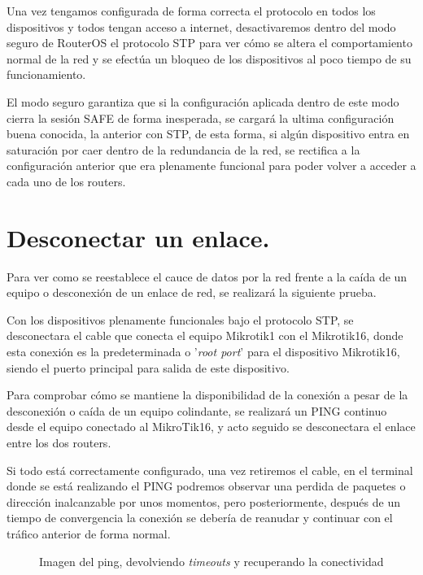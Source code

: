 Una vez tengamos configurada de forma correcta el protocolo en todos los dispositivos y todos tengan acceso a internet, desactivaremos dentro del modo seguro de RouterOS el protocolo STP para ver cómo se altera el comportamiento normal de la red y se efectúa un bloqueo de los dispositivos al poco tiempo de su funcionamiento.

El modo seguro garantiza que si la configuración aplicada dentro de este modo cierra la sesión SAFE de forma inesperada, se cargará la ultima configuración buena conocida, la anterior con STP, de esta forma, si algún dispositivo entra en saturación por caer dentro de la redundancia de la red, se rectifica a la configuración anterior que era plenamente funcional para poder volver a acceder a cada uno de los routers.

\section{Desconectar un enlace.}

Para ver como se reestablece el cauce de datos por la red frente a la caída de un equipo o desconexión de un enlace de red, se realizará la siguiente prueba.

Con los dispositivos plenamente funcionales bajo el protocolo STP, se desconectara el cable que conecta el equipo Mikrotik1 con el Mikrotik16, donde esta conexión es la predeterminada o '\textit{root port}' para el dispositivo Mikrotik16, siendo el puerto principal para salida de este dispositivo.

Para comprobar cómo se mantiene la disponibilidad de la conexión a pesar de la desconexión o caída de un equipo colindante, se realizará un PING continuo desde el equipo conectado al MikroTik16, y acto seguido se desconectara el enlace entre los dos routers.

Si todo está correctamente configurado, una vez retiremos el cable, en el terminal donde se está realizando el PING podremos observar una perdida de paquetes o dirección inalcanzable por unos momentos, pero posteriormente, después de un tiempo de convergencia la conexión se debería de reanudar y continuar con el tráfico anterior de forma normal.


\begin{figure}[h!]\centering
	\caption{Imagen del ping, devolviendo \textit{timeouts} y recuperando la conectividad}
	\label{fdesconect4}
	\bigskip
\end{figure}

